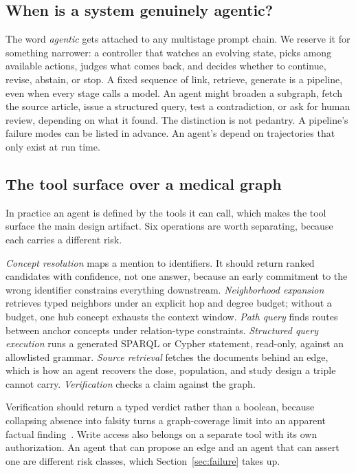 \subsection{When is a system genuinely agentic?}

The word \emph{agentic} gets attached to any multistage prompt chain. We reserve it for something narrower: a controller that watches an evolving state, picks among available actions, judges what comes back, and decides whether to continue, revise, abstain, or stop. A fixed sequence of link, retrieve, generate is a pipeline, even when every stage calls a model. An agent might broaden a subgraph, fetch the source article, issue a structured query, test a contradiction, or ask for human review, depending on what it found. The distinction is not pedantry. A pipeline's failure modes can be listed in advance. An agent's depend on trajectories that only exist at run time.

\subsection{The tool surface over a medical graph}

In practice an agent is defined by the tools it can call, which makes the tool surface the main design artifact. Six operations are worth separating, because each carries a different risk.

\emph{Concept resolution} maps a mention to identifiers. It should return ranked candidates with confidence, not one answer, because an early commitment to the wrong identifier constrains everything downstream. \emph{Neighborhood expansion} retrieves typed neighbors under an explicit hop and degree budget; without a budget, one hub concept exhausts the context window. \emph{Path query} finds routes between anchor concepts under relation-type constraints. \emph{Structured query execution} runs a generated SPARQL or Cypher statement, read-only, against an allowlisted grammar. \emph{Source retrieval} fetches the documents behind an edge, which is how an agent recovers the dose, population, and study design a triple cannot carry. \emph{Verification} checks a claim against the graph.

Verification should return a typed verdict rather than a boolean, because collapsing absence into falsity turns a graph-coverage limit into an apparent factual finding~\cite{su2025kgarevion}. Write access also belongs on a separate tool with its own authorization. An agent that can propose an edge and an agent that can assert one are different risk classes, which Section~\ref{sec:failure} takes up.

